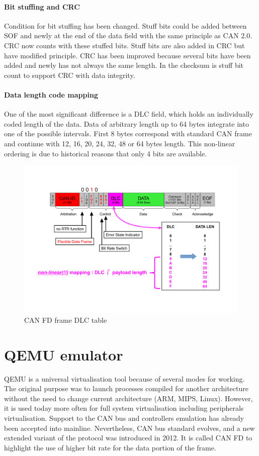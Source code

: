 \documentclass{ctuthesis}
\begin{document}
   \subsubsection{Bit stuffing and CRC}
    Condition for bit stuffing has been changed. Stuff bits could be added between SOF and newly at the end of the data field with the same principle as CAN 2.0. CRC now counts with these stuffed bits. Stuff bits are also added in CRC but have modified principle. CRC has been improved because several bits have been added and newly has not always the same length. In the checksum is stuff bit count to support CRC with data integrity.
   \subsubsection{Data length code mapping}
    One of the most significant difference is a DLC field, which holds an individually coded length of the data. Data of arbitrary length up to 64 bytes integrate into one of the possible intervals. First 8 bytes correspond with standard CAN frame and continue with 12, 16, 20, 24, 32, 48 or 64 bytes length. This non-linear ordering is due to historical reasons that only 4 bits are available.
    \begin{figure}[H]
    \includegraphics[width=1\textwidth]{agl2017-socketcan-can_fd_dlc}
    \caption{CAN FD frame DLC table \cite{canfd_dlc}}
    \end{figure}
 
\chapter{QEMU emulator}
 QEMU is a universal virtualisation tool because of several modes for working. The original purpose was to launch processes compiled for another architecture without the need to change current architecture (ARM, MIPS, Linux). However, it is used today more often for full system virtualisation including peripherals virtualisation. Support to the CAN bus and controllers emulation has already been accepted into mainline. Nevertheless, CAN bus standard evolves, and a new extended variant of the protocol was introduced in 2012. It is called CAN FD to highlight the use of higher bit rate for the data portion of the frame.
\end{document}
